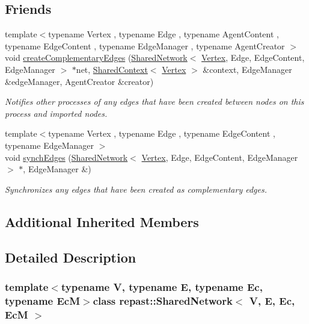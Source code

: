 \subsection*{Friends}
\begin{DoxyCompactItemize}
\item 
{\footnotesize template$<$typename Vertex , typename Edge , typename Agent\-Content , typename Edge\-Content , typename Edge\-Manager , typename Agent\-Creator $>$ }\\void \hyperlink{classrepast_1_1_shared_network_aab38d29bc953ebb66d39ecb27f392acf}{create\-Complementary\-Edges} (\hyperlink{classrepast_1_1_shared_network}{Shared\-Network}$<$ \hyperlink{classrepast_1_1_vertex}{Vertex}, Edge, Edge\-Content, Edge\-Manager $>$ $\ast$net, \hyperlink{classrepast_1_1_shared_context}{Shared\-Context}$<$ \hyperlink{classrepast_1_1_vertex}{Vertex} $>$ \&context, Edge\-Manager \&edge\-Manager, Agent\-Creator \&creator)
\begin{DoxyCompactList}\small\item\em Notifies other processes of any edges that have been created between nodes on this process and imported nodes. \end{DoxyCompactList}\item 
{\footnotesize template$<$typename Vertex , typename Edge , typename Edge\-Content , typename Edge\-Manager $>$ }\\void \hyperlink{classrepast_1_1_shared_network_a97ffdbe7b82199b6b83c1f581c820a85}{synch\-Edges} (\hyperlink{classrepast_1_1_shared_network}{Shared\-Network}$<$ \hyperlink{classrepast_1_1_vertex}{Vertex}, Edge, Edge\-Content, Edge\-Manager $>$ $\ast$, Edge\-Manager \&)
\begin{DoxyCompactList}\small\item\em Synchronizes any edges that have been created as complementary edges. \end{DoxyCompactList}\end{DoxyCompactItemize}
\subsection*{Additional Inherited Members}


\subsection{Detailed Description}
\subsubsection*{template$<$typename V, typename E, typename Ec, typename Ec\-M$>$class repast\-::\-Shared\-Network$<$ V, E, Ec, Ec\-M $>$}

